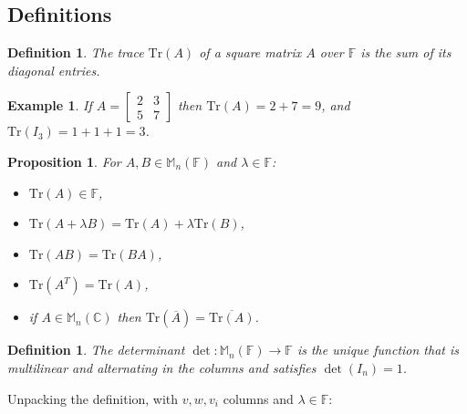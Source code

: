 \documentclass[12pt]{article}
\renewcommand{\Tr}{\mathrm{Tr}}
\theoremstyle{breakplain}
\newtheorem{prop}[theorem]{Proposition}
\theoremstyle{breakdef}
\newtheorem{definition}[theorem]{Definition}
\newtheorem*{example}{Example}
\theoremstyle{remark}
\begin{document}
\subsection{Definitions}
\begin{definition}
    The \emph{trace} $\Tr(A)$ of a square matrix $A$ over $\mathbb{F}$ is the sum of its diagonal entries.
\end{definition}
\begin{example}
    If $A=\begin{bmatrix}
        2 & 3\\
        5 & 7
    \end{bmatrix}$ then $\Tr(A)=2+7=9$, and $\Tr(I_3)=1+1+1=3$.
\end{example}
\begin{prop}
    For $A,B \in \mathbb{M}_{n}(\mathbb{F})$ and $\lambda\in\mathbb{F}$:
    \begin{itemize}
        \item $\Tr(A)\in \mathbb{F}$,
        \item $\Tr(A+\lambda B)=\Tr(A)+\lambda \Tr(B)$,
        \item $\Tr(AB)=\Tr(BA)$,
        \item $\Tr(A^T)=\Tr(A)$,
        \item if $A\in\mathbb{M}_{n}(\mathbb{C})$ then $\Tr(\overline{A})=\overline{\Tr(A)}$.
    \end{itemize}
\end{prop}
\begin{definition}
    The \emph{determinant} $\det:\mathbb{M}_n(\mathbb{F})\to\mathbb{F}$ is the unique function that is multilinear and alternating in the columns and satisfies $\det(I_n)=1$.
\end{definition}
Unpacking the definition, with $v,w,v_i$ columns and $\lambda\in\mathbb{F}$:
\end{document}
